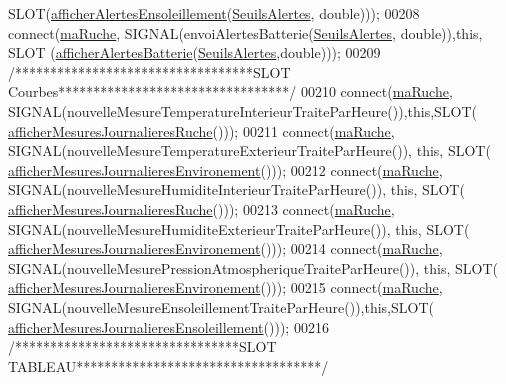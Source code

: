 \begin{DoxyCode}
      SLOT(\hyperlink{class_ruche_ihm_aea5efc506f9825db2a4eb39a40d7eb18}{afficherAlertesEnsoleillement}(\hyperlink{parametres_8h_aaa6de8207c94675264c90b10b613368d}{SeuilsAlertes}, \textcolor{keywordtype}{double})));
00208         connect(\hyperlink{class_ruche_ihm_a43a6b1fa31f4fba58d919daae3707b38}{maRuche}, SIGNAL(envoiAlertesBatterie(\hyperlink{parametres_8h_aaa6de8207c94675264c90b10b613368d}{SeuilsAlertes}, \textcolor{keywordtype}{double})),\textcolor{keyword}{this}, SLOT
      (\hyperlink{class_ruche_ihm_a5181062e21dc73908b660d97e9621fb6}{afficherAlertesBatterie}(\hyperlink{parametres_8h_aaa6de8207c94675264c90b10b613368d}{SeuilsAlertes},\textcolor{keywordtype}{double})));
00209         \textcolor{comment}{/**********************************SLOT Courbes*********************************/}
00210         connect(\hyperlink{class_ruche_ihm_a43a6b1fa31f4fba58d919daae3707b38}{maRuche}, SIGNAL(nouvelleMesureTemperatureInterieurTraiteParHeure()),\textcolor{keyword}{this},SLOT(
      \hyperlink{class_ruche_ihm_a94bd98327a73a15aad1306fc31f53ce8}{afficherMesuresJournalieresRuche}()));
00211         connect(\hyperlink{class_ruche_ihm_a43a6b1fa31f4fba58d919daae3707b38}{maRuche}, SIGNAL(nouvelleMesureTemperatureExterieurTraiteParHeure()), \textcolor{keyword}{this}, SLOT(
      \hyperlink{class_ruche_ihm_a5ee5942435915ca134765f42ff4b9061}{afficherMesuresJournalieresEnvironement}()));
00212         connect(\hyperlink{class_ruche_ihm_a43a6b1fa31f4fba58d919daae3707b38}{maRuche}, SIGNAL(nouvelleMesureHumiditeInterieurTraiteParHeure()), \textcolor{keyword}{this}, SLOT(
      \hyperlink{class_ruche_ihm_a94bd98327a73a15aad1306fc31f53ce8}{afficherMesuresJournalieresRuche}()));
00213         connect(\hyperlink{class_ruche_ihm_a43a6b1fa31f4fba58d919daae3707b38}{maRuche}, SIGNAL(nouvelleMesureHumiditeExterieurTraiteParHeure()), \textcolor{keyword}{this}, SLOT(
      \hyperlink{class_ruche_ihm_a5ee5942435915ca134765f42ff4b9061}{afficherMesuresJournalieresEnvironement}()));
00214         connect(\hyperlink{class_ruche_ihm_a43a6b1fa31f4fba58d919daae3707b38}{maRuche}, SIGNAL(nouvelleMesurePressionAtmospheriqueTraiteParHeure()), \textcolor{keyword}{this}, SLOT(
      \hyperlink{class_ruche_ihm_a5ee5942435915ca134765f42ff4b9061}{afficherMesuresJournalieresEnvironement}()));
00215         connect(\hyperlink{class_ruche_ihm_a43a6b1fa31f4fba58d919daae3707b38}{maRuche}, SIGNAL(nouvelleMesureEnsoleillementTraiteParHeure()),\textcolor{keyword}{this},SLOT(
      \hyperlink{class_ruche_ihm_abc250d15e6782c522b3d6676e0ee032d}{afficherMesuresJournalieresEnsoleillement}()));
00216         \textcolor{comment}{/********************************SLOT TABLEAU***********************************/}

\end{DoxyCode}
